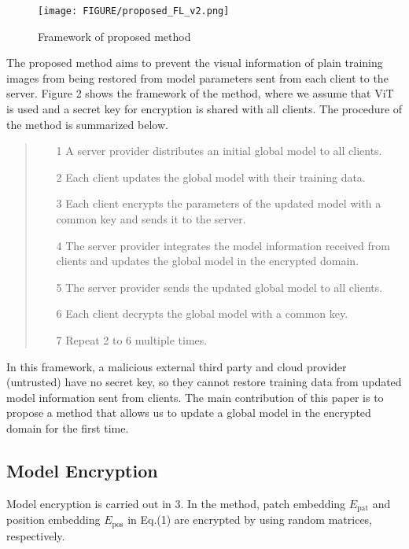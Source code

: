 \documentclass[conference, a4paper]{IEEEtran}
\begin{document}
\begin{figure}[bth]
    \centering
    \texttt{[image: FIGURE/proposed\_FL\_v2.png]}
    \caption{Framework of proposed method}
\end{figure}
The proposed method aims to prevent the visual information of plain training images from being restored from model parameters sent from each client to the server. Figure 2 shows the framework of the method, where we assume that ViT is used and a secret key for encryption is shared with all clients. The procedure of the method is summarized below.
\begin{quote}
 \begin{itemize}
  \item[\textcircled{\scriptsize{1}}] A server provider distributes an initial global model to all clients.
  \item[\textcircled{\scriptsize{2}}] Each client updates the global model with their training data.
  \item[\textcircled{\scriptsize{3}}] Each client encrypts the parameters of the updated model with a common key and sends it to the server.
  \item[\textcircled{\scriptsize{4}}] The server provider integrates the model information received from clients and updates the global model in the encrypted domain.
  \item[\textcircled{\scriptsize{5}}] The server provider sends the updated global model to all clients.
  \item[\textcircled{\scriptsize{6}}] Each client decrypts the global model with a common key. 
  \item[\textcircled{\scriptsize{7}}] Repeat \textcircled{\scriptsize{2}} to \textcircled{\scriptsize{6}} multiple times.
 \end{itemize}
\end{quote}
\indent In this framework, a malicious external third party and cloud provider (untrusted) have no secret key, so they cannot restore training data from updated model information sent from clients. The main contribution of this paper is to propose a method that allows us to update a global model in the encrypted domain for the first time.  \\

\subsection{Model Encryption}
Model encryption is carried out in \textcircled{\scriptsize{3}}.  In the method, patch embedding $E_{\text{pat}}$ and position embedding $E_{\text{pos}}$ in Eq.(1) are encrypted by using random matrices, respectively.
\end{document}
